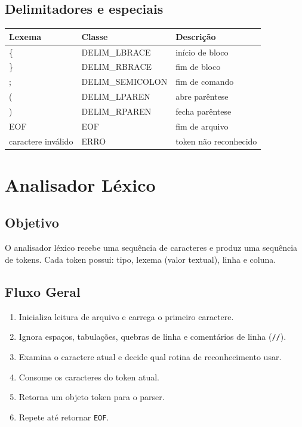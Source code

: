 \documentclass[12pt,a4paper]{article}
\begin{document}
\subsection{Delimitadores e especiais}
\begin{longtable}{>{\raggedright\arraybackslash\ttfamily}p{1.8cm} >{\raggedright\arraybackslash\ttfamily}p{4.8cm} >{\raggedright\arraybackslash}p{5.8cm}}
\toprule
\textnormal{Lexema} & \textnormal{Classe} & \textnormal{Descrição} \\
\midrule
\endhead
\{ & DELIM\_LBRACE & início de bloco \\
\} & DELIM\_RBRACE & fim de bloco \\
; & DELIM\_SEMICOLON & fim de comando \\
( & DELIM\_LPAREN & abre parêntese \\
) & DELIM\_RPAREN & fecha parêntese \\
EOF & EOF & fim de arquivo \\
caractere inválido & ERRO & token não reconhecido \\
\bottomrule
\end{longtable}

\section{Analisador Léxico}

\subsection{Objetivo}
O analisador léxico recebe uma sequência de caracteres e produz uma sequência de tokens. Cada token possui: tipo, lexema (valor textual), linha e coluna.

\subsection{Fluxo Geral}
\begin{enumerate}[label=\arabic*.]
  \item Inicializa leitura de arquivo e carrega o primeiro caractere.
  \item Ignora espaços, tabulações, quebras de linha e comentários de linha (\texttt{//}).
  \item Examina o caractere atual e decide qual rotina de reconhecimento usar.
  \item Consome os caracteres do token atual.
  \item Retorna um objeto token para o parser.
  \item Repete até retornar \texttt{EOF}.
\end{enumerate}
\end{document}
